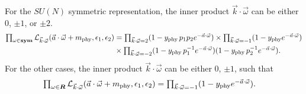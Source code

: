 \documentclass[letterpaper, 11pt]{article}
\newcommand{\nn}{\nonumber}
\def\CL{{\cal L}}
\def\e{\epsilon}
\def\w{\omega}
\begin{document}
For the $SU(N)$ symmetric representation, the inner product $ \vec{k}\cdot \vec{\w}$ can be either $0$, $\pm 1$, or $\pm 2$.
\begin{align}
  \textstyle\prod_{\w \in \boldsymbol{\textbf{sym}}} \CL_{\vec{k}\cdot\vec{\w}}(\vec{a}\cdot \vec{\w} + m_{\text{phy}}, \e_1,\e_2)  &= \textstyle\prod_{\vec{k}\cdot \vec{\w} = 2} (1-y_\text{phy}\,  p_1p_2 e^{-\vec{a}\cdot \vec{\w}}) \times \prod_{\vec{k}\cdot \vec{\w} = -1}(1-y_\text{phy} e^{-\vec{a}\cdot \vec{\w}}) \nn\\&\textstyle\times \prod_{\vec{k}\cdot \vec{\w} = -2} (1-y_\text{phy}\,  p_1^{-1} e^{-\vec{a}\cdot \vec{\w}})(1-y_\text{phy}\,  p_2^{-1} e^{-\vec{a}\cdot \vec{\w}}).
 \end{align}
For the other cases, the inner product $ \vec{k}\cdot \vec{\w}$ can be either $0$, $\pm 1$, such that 
\begin{align}
  \textstyle\prod_{\w \in \boldsymbol{R}} \CL_{\vec{k}\cdot\vec{\w}}(\vec{a}\cdot \vec{\w} + m_{\text{phy}}, \e_1,\e_2)  &= \textstyle \prod_{\vec{k}\cdot \vec{\w} = -1}(1-y_\text{phy} e^{-\vec{a}\cdot \vec{\w}}) .
\end{align}
\end{document}
